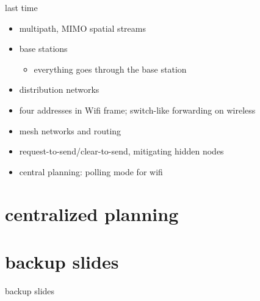 \date{}
\title{}
\date{}

\begin{frame}
    \titlepage
\end{frame}


\begin{frame}{last time}
    \begin{itemize}
    \item multipath, MIMO spatial streams
    \item base stations
        \begin{itemize}
        \item everything goes through the base station
        \end{itemize}
    \item distribution networks
    \item four addresses in Wifi frame; switch-like forwarding on wireless
    \item mesh networks and routing
    \item request-to-send/clear-to-send, mitigating hidden nodes
    \item central planning: polling mode for wifi
    \end{itemize}
\end{frame}

\section{centralized planning}







\section{backup slides}
\begin{frame}{backup slides}
\end{frame}


